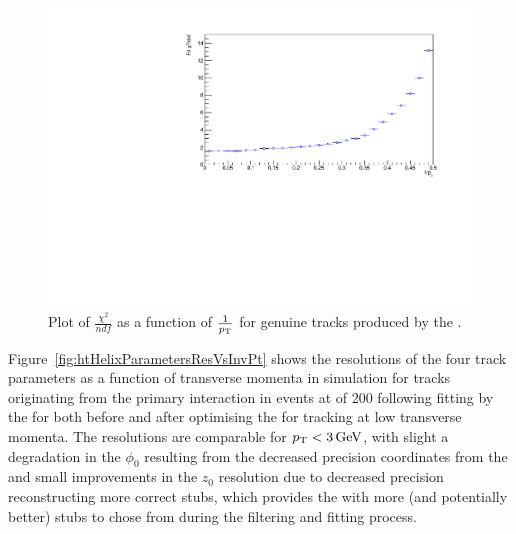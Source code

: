 \begin{figure}[tbp]
\centering
\includegraphics[width=\textwidth]{figs/tk-upgrade/results-lowPtTracking/kfChi2NdfVsInvPtFlatGeometry_5000.pdf}
\caption{Plot of $\frac{\chi^{2}}{ndf}$ as a function of $\frac{1}{p_{\mathrm{T}}}$ for genuine tracks produced by the \KF.}
\label{fig:2GeVFlatChi2Ndf}
\end{figure}

Figure~\ref{fig:htHelixParametersResVsInvPt} shows the resolutions of the four track parameters as a function of transverse momenta in simulation for tracks originating from the primary interaction in \ttbar events at \PU of 200 following fitting by the \KF for both before and after optimising the \HT for tracking at low transverse momenta.
The resolutions are comparable for $p_{\mathrm{T}} < 3\,\text{Ge\hspace{-.08em}V}$, with slight a degradation in the $\phi_{0}$ resulting from the decreased precision coordinates from the \HT and small improvements in the $z_{0}$ resolution due to decreased precision \HT reconstructing more correct stubs, which provides the \KF with more (and potentially better) stubs to chose from during the filtering and fitting process.

